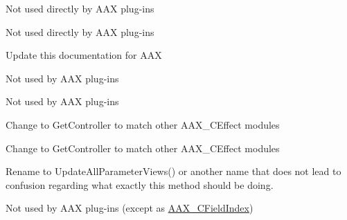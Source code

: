 
\begin{DoxyRefList}
\item[Member \mbox{\hyperlink{_a_a_x_8h_a1cd2e3eaaf5e5eca440d969aff9699c3}{A\+A\+X\+\_\+\+C\+Audio\+In\+Port}} ]\label{todo__todo000011}%
%
Not used directly by A\+AX plug-\/ins  
\item[Member \mbox{\hyperlink{_a_a_x_8h_ab6daf1df27936bf9fbcf285e033cdde2}{A\+A\+X\+\_\+\+C\+Audio\+Out\+Port}} ]\label{todo__todo000012}%
%
Not used directly by A\+AX plug-\/ins  
\item[Class \mbox{\hyperlink{class_a_a_x___c_chunk_data_parser}{A\+A\+X\+\_\+\+C\+Chunk\+Data\+Parser}} ]\label{todo__todo000014}%
%
Update this documentation for A\+AX 
\item[Member \mbox{\hyperlink{_a_a_x_8h_a7e697acf597bd7024de6bb13b9845ce7}{A\+A\+X\+\_\+\+C\+Component\+ID}} ]\label{todo__todo000008}%
%
Not used by A\+AX plug-\/ins  
\item[Member \mbox{\hyperlink{_a_a_x_8h_a9a9a14ab1486fa8c6734b96976be3056}{A\+A\+X\+\_\+\+C\+Count}} ]\label{todo__todo000006}%
%
Not used by A\+AX plug-\/ins  
\item[Member \mbox{\hyperlink{class_a_a_x___c_effect_direct_data_a351f34e70924c6290a7dd76b1cbdec10}{A\+A\+X\+\_\+\+C\+Effect\+Direct\+Data::Controller}} (void)]\label{todo__todo000015}%
%
Change to Get\+Controller to match other A\+A\+X\+\_\+\+C\+Effect modules  
\item[Member \mbox{\hyperlink{class_a_a_x___c_effect_direct_data_a188edabd56caf4b306e1aed9381c45a2}{A\+A\+X\+\_\+\+C\+Effect\+Direct\+Data::Effect\+Parameters}} (void)]\label{todo__todo000016}%
%
Change to Get\+Controller to match other A\+A\+X\+\_\+\+C\+Effect modules  
\item[Member \mbox{\hyperlink{class_a_a_x___c_effect_g_u_i_a5f5b8cc63923c4b371bcbd1d3391a17a}{A\+A\+X\+\_\+\+C\+Effect\+G\+UI::Update\+All\+Parameters}} (void)]\label{todo__todo000017}%
%
Rename to {\ttfamily Update\+All\+Parameter\+Views()} or another name that does not lead to confusion regarding what exactly this method should be doing.  
\item[Member \mbox{\hyperlink{_a_a_x_8h_a24ac375fa55ccadbc3126e6d81146c28}{A\+A\+X\+\_\+\+C\+Index}} ]\label{todo__todo000005}%
%
Not used by A\+AX plug-\/ins (except as \mbox{\hyperlink{_a_a_x_8h_ae807f8986143820cfb5d6da32165c9c7}{A\+A\+X\+\_\+\+C\+Field\+Index}})  

\end{DoxyRefList}
